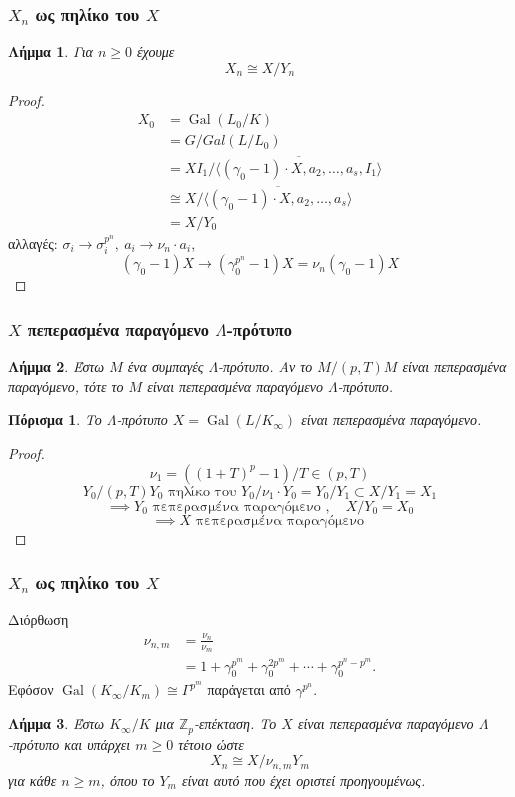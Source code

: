 \documentclass{beamer}
\newcommand{\Gal}{\operatorname{Gal}}
\newcommand{\Z}{\mathbb{Z}}
\newtheorem{lhmma}{Λήμμα}
\newtheorem{cor}{Πόρισμα}
\begin{document}
\begin{frame}
\frametitle{$X_n$ ως πηλίκο του $X$}
\begin{lhmma}
    Για $n\geq 0$ έχουμε
    $$X_n \cong X/Y_n$$
\end{lhmma}
\pause 
\begin{proof}
\begin{align*}
        X_0 &= \Gal(L_0/K) \\
        &= G/Gal(L/L_0) \\
        &= XI_1 / \overline{\langle (\gamma_0-1)\cdot X, a_2,\ldots,a_s,I_1\rangle}\\
        &\cong X/\overline{\langle (\gamma_0-1)\cdot X,a_2,\ldots,a_s\rangle} \\
        &= X/Y_0
    \end{align*}
    αλλαγές: $\sigma_i \rightarrow \sigma_i^{p^n}, \ a_i \rightarrow \nu_n \cdot a_i$, $$(\gamma_0-1)X \rightarrow (\gamma_0^{p^n}-1)X = \nu_n(\gamma_0-1)X$$
\end{proof}

\end{frame}

\begin{frame}
\frametitle{$X$ πεπερασμένα παραγόμενο $\Lambda$-πρότυπο}
\begin{lhmma}
Έστω $M$ ένα συμπαγές $\Lambda$-πρότυπο. Αν το $M/(p,T)M$ είναι πεπερασμένα παραγόμενο, τότε το $M$ είναι πεπερασμένα παραγόμενο $\Lambda$-πρότυπο.
\end{lhmma}
\pause 
\begin{cor}
    Το $\Lambda$-πρότυπο $X= \Gal(L/K_\infty)$ είναι πεπερασμένα παραγόμενο.
\end{cor}
\pause
\begin{proof}$$\nu_1 = ((1+T)^p -1)/T \in (p,T)$$
$$Y_0/(p,T)Y_0 \text{ πηλίκο του } Y_0/\nu_1 \cdot Y_0 = Y_0/Y_1 \subset X/Y_1 = X_1$$
$$\implies Y_0 \text{ πεπερασμένα παραγόμενο }, \quad  X/Y_0 = X_0$$
$$\implies X \text{ πεπερασμένα παραγόμενο }$$
\end{proof}

\end{frame}

\begin{frame}
\frametitle{$X_n$ ως πηλίκο του $X$}
\begin{block}{Διόρθωση}
\begin{align*} 
    \nu_{n,m} &= \frac{\nu_n}{\nu_m} \\
    &= 1+\gamma_0^{p^m} + \gamma_0^{2p^m} + \cdots + \gamma_0^{p^n - p^m}.
\end{align*} Εφόσον $\Gal(K_\infty/K_m) \cong \Gamma^{p^m}$ παράγεται από $\gamma^{p^n}$.
\end{block}
\pause
\begin{lhmma}
Έστω $K_\infty/K$ μια $\Z_p$-επέκταση. Το $X$ είναι πεπερασμένα παραγόμενο $\Lambda$-πρότυπο και υπάρχει $m\geq 0$ τέτοιο ώστε
    $$X_n \cong X/\nu_{n,m} Y_m$$ για κάθε $n\geq m$, όπου το $Y_m$ είναι αυτό που έχει οριστεί προηγουμένως.
\end{lhmma}


\end{frame}
\end{document}
